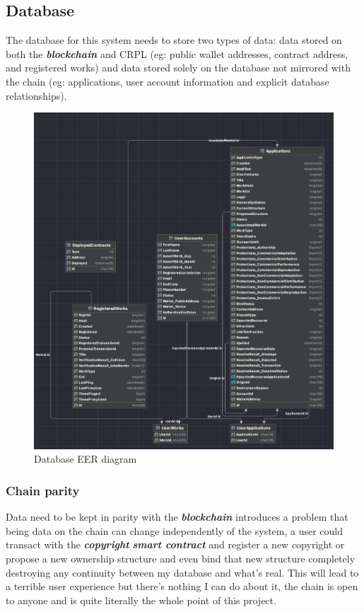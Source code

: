 \documentclass[12pt]{article}
\newcommand{\keyword}[1]{\textbf{\textit{#1}}}
\begin{document}
\subsection{Database}

The database for this system needs to store two types of data: data stored on both the \keyword{blockchain} and CRPL (eg: public wallet addresses, contract address, and registered works) and data stored solely on the database not mirrored with the chain (eg: applications, user account information and explicit database relationships).

\begin{figure}[H]
\caption{Database EER diagram}
\centering
\includegraphics[width=\textwidth,height=0.7\textheight,keepaspectratio]{images/patterns/database}
\end{figure}

\subsubsection{Chain parity}

Data need to be kept in parity with the \keyword{blockchain} introduces a problem that being data on the chain can change independently of the system, a user could transact with the \keyword{copyright} \keyword{smart contract} and register a new copyright or propose a new ownership structure and even bind that new structure completely destroying any continuity between my database and what's real. This will lead to a terrible user experience but there's nothing I can do about it, the chain is open to anyone and is quite literally the whole point of this project.
\end{document}
